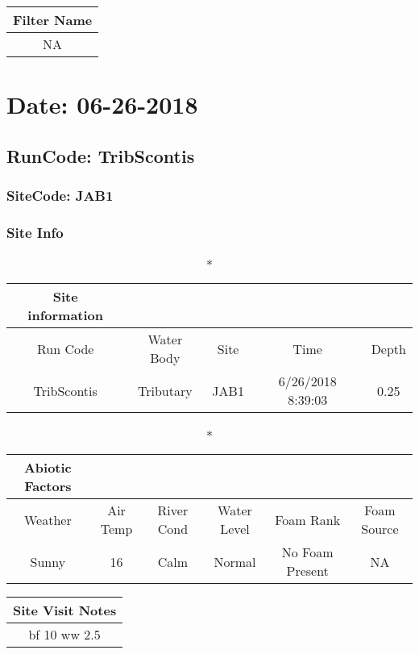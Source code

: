 \documentclass[
  letterpaper,
  DIV=11,
  numbers=noendperiod]{scrartcl}
\begin{document}
\begin{longtable*}{c}
\toprule
Filter Name \\ 
\midrule\addlinespace[2.5pt]
NA \\ 
\bottomrule
\end{longtable*}

\hypertarget{date-06-26-2018-5}{%
\section{Date: 06-26-2018}\label{date-06-26-2018-5}}

\hypertarget{runcode-tribscontis-5}{%
\subsection{RunCode: TribScontis}\label{runcode-tribscontis-5}}

\hypertarget{sitecode-jab1}{%
\subsubsection{SiteCode: JAB1}\label{sitecode-jab1}}

\subsubsection{Site Info}

\begin{longtable*}{ccccc}
\caption*{
{\large Site information}
} \\ 
\toprule
Run Code & Water Body & Site & Time & Depth \\ 
\midrule\addlinespace[2.5pt]
TribScontis & Tributary & JAB1 & 6/26/2018 8:39:03 & 0.25 \\ 
\bottomrule
\end{longtable*}

\begin{longtable*}{cccccc}
\caption*{
{\large Abiotic Factors}
} \\ 
\toprule
Weather & Air Temp & River Cond & Water Level & Foam Rank & Foam Source \\ 
\midrule\addlinespace[2.5pt]
Sunny & 16 & Calm & Normal & No Foam Present & NA \\ 
\bottomrule
\end{longtable*}

\begin{longtable*}{c}
\toprule
Site Visit Notes \\ 
\midrule\addlinespace[2.5pt]
bf 10
ww 2.5 \\ 
\bottomrule
\end{longtable*}
\end{document}
